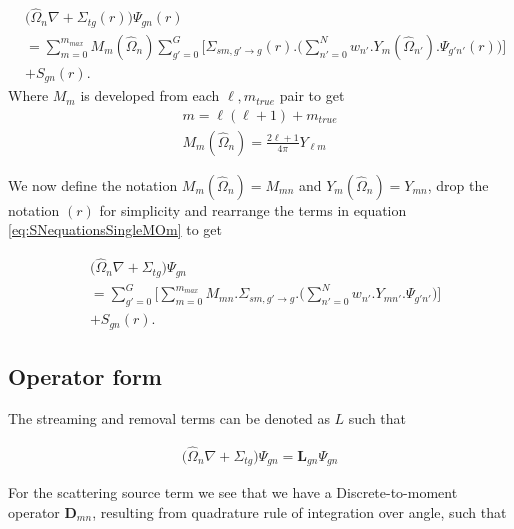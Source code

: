 \documentclass[11pt,letterpaper,titlepage]{article}
\numberwithin{equation}{section}
\begin{document}
\begin{equation} \label{eq:SNequationsSingleMOm}
\begin{aligned}
&\biggr(\hat{\Omega}_n\nabla +\Sigma_{tg} (r)\biggr)  \Psi_{gn} (r)\\
&=       
\sum_{m=0}^{m_{max}}
M_{m}(\hat{\Omega}_n)
\sum_{g'=0}^{G} \biggr[  
\Sigma_{sm,g'{\to}g} (r)
. \biggr(
\sum_{n'=0}^{N} w_{n'} . Y_{m}(\hat{\Omega}_{n'}).\Psi_{g'n'}(r) 
\biggr)
\biggr]\\
&+  S_{gn} (r).
\end{aligned}
\end{equation}
\newline
Where $M_m$ is developed from each $\ell,m_{true}$ pair to get
\begin{equation*}
\begin{aligned}
m=\ell(\ell+1)+ m_{true}\\
M_m(\hat{\Omega}_n) = \frac{2\ell+1}{4\pi}Y_{\ell m}
\end{aligned}
\end{equation*}

We now define the notation $M_m(\hat{\Omega}_n)=M_{mn}$ and $Y_m (\hat{\Omega}_n) = Y_{mn}$, drop the notation $(r)$ for simplicity and rearrange the terms in equation \ref{eq:SNequationsSingleMOm} to get

\begin{equation} \label{eq:SNequationsSingleMOmReArr}
\begin{aligned}
&\biggr(\hat{\Omega}_n\nabla +\Sigma_{tg} \biggr)  \Psi_{gn} \\
&=    \sum_{g'=0}^{G} \biggr[    
\sum_{m=0}^{m_{max}}
M_{mn}
. 
\Sigma_{sm,g'{\to}g} 
. \biggr(
\sum_{n'=0}^{N} w_{n'} . Y_{mn'}.\Psi_{g'n'}
\biggr)
\biggr]\\
&+  S_{gn} (r).
\end{aligned}
\end{equation}


\vspace{1.5cm}
\subsection{Operator form}
The streaming and removal terms can be denoted as $L$ such that

\begin{align*}
\biggr(\hat{\Omega}_n\nabla +\Sigma_{tg} \biggr)  \Psi_{gn}  = \mathbf{L}_{gn}\Psi_{gn} 
\end{align*}

\noindent For the scattering source term we see that we have a Discrete-to-moment operator $\mathbf{D}_{mn}$, resulting from quadrature rule of integration over angle, such that
\end{document}
